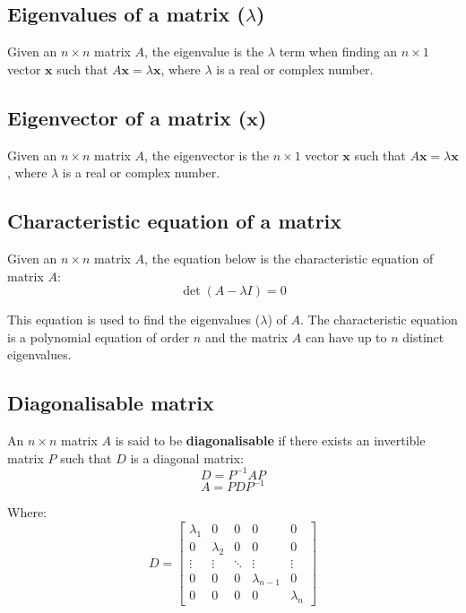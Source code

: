 \documentclass[11pt]{article}
\begin{document}
\subsection{Eigenvalues of a matrix (\(\lambda\))}
\label{sec:org2bacd94}
Given an \(n \times n\) matrix \(A\), the eigenvalue is the \(\lambda\) term when finding an \(n \times 1\) vector \(\boldsymbol{x}\) such that \(A \boldsymbol{x} = \lambda \boldsymbol{x}\), where \(\lambda\) is a real or complex number.

\subsection{Eigenvector of a matrix (\(\boldsymbol{x}\))}
\label{sec:org337fca7}
Given an \(n \times n\) matrix \(A\), the eigenvector is the \(n \times 1\) vector \(\boldsymbol{x}\) such that \(A \boldsymbol{x} = \lambda \boldsymbol{x}\), where \(\lambda\) is a real or complex number.

\subsection{Characteristic equation of a matrix}
\label{sec:orgeb879d3}
Given an \(n \times n\) matrix \(A\), the equation below is the characteristic equation of matrix \(A\):
\[\det (A - \lambda I) = 0\]

This equation is used to find the eigenvalues (\(\lambda\)) of \(A\). The characteristic equation is a polynomial equation of order \(n\) and the matrix \(A\) can have up to \(n\) distinct eigenvalues.

\subsection{Diagonalisable matrix}
\label{sec:org460c3ee}
An \(n \times n\) matrix \(A\) is said to be \textbf{diagonalisable} if there exists an invertible matrix \(P\) such that \(D\) is a diagonal matrix:
\[D = P^{-1} A P\]
\[A = PDP^{-1}\]

Where:
\begin{displaymath}
D = \begin{bmatrix}
\lambda_1 & 0 & 0 & 0 & 0 \\
0 & \lambda_2 & 0 & 0 & 0 \\
\vdots & \vdots & \ddots & \vdots & \vdots \\
0 & 0 & 0 & \lambda_{n-1} & 0 \\
0 & 0 & 0 & 0 & \lambda_{n}
\end{bmatrix}
\end{displaymath}
\end{document}

